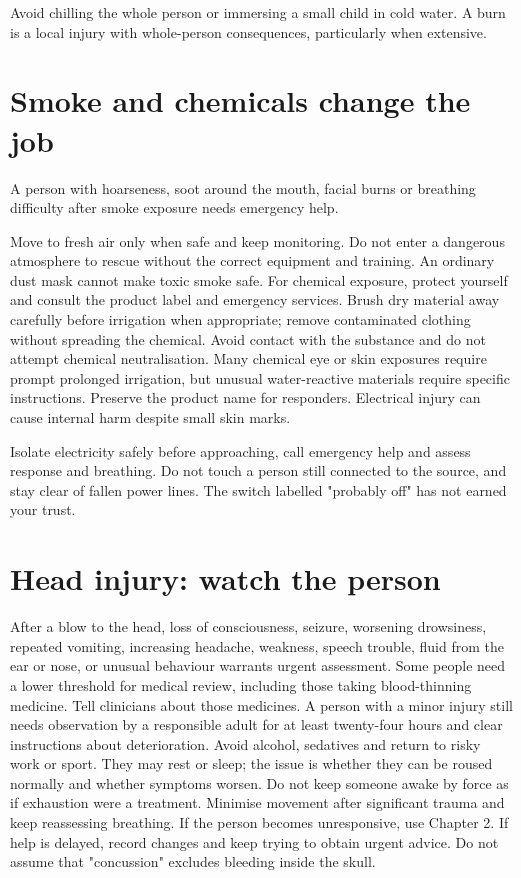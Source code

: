 \documentclass[10pt,openright]{book}
\begin{document}
Avoid chilling the whole person or immersing a small child in cold water. A burn is a local injury with whole-person consequences, particularly when extensive.

\section*{Smoke and chemicals change the job}
A person with hoarseness, soot around the mouth, facial burns or breathing difficulty after smoke exposure needs emergency help.

Move to fresh air only when safe and keep monitoring. Do not enter a dangerous atmosphere to rescue without the correct equipment and training. An ordinary dust mask cannot make toxic smoke safe. For chemical exposure, protect yourself and consult the product label and emergency services. Brush dry material away carefully before irrigation when appropriate; remove contaminated clothing without spreading the chemical. Avoid contact with the substance and do not attempt chemical neutralisation. Many chemical eye or skin exposures require prompt prolonged irrigation, but unusual water-reactive materials require specific instructions. Preserve the product name for responders. Electrical injury can cause internal harm despite small skin marks.

Isolate electricity safely before approaching, call emergency help and assess response and breathing. Do not touch a person still connected to the source, and stay clear of fallen power lines. The switch labelled "probably off" has not earned your trust.

\section*{Head injury: watch the person}
After a blow to the head, loss of consciousness, seizure, worsening drowsiness, repeated vomiting, increasing headache, weakness, speech trouble, fluid from the ear or nose, or unusual behaviour warrants urgent assessment. Some people need a lower threshold for medical review, including those taking blood-thinning medicine. Tell clinicians about those medicines. A person with a minor injury still needs observation by a responsible adult for at least twenty-four hours and clear instructions about deterioration. Avoid alcohol, sedatives and return to risky work or sport. They may rest or sleep; the issue is whether they can be roused normally and whether symptoms worsen. Do not keep someone awake by force as if exhaustion were a treatment. Minimise movement after significant trauma and keep reassessing breathing. If the person becomes unresponsive, use Chapter 2. If help is delayed, record changes and keep trying to obtain urgent advice. Do not assume that "concussion" excludes bleeding inside the skull.
\end{document}
